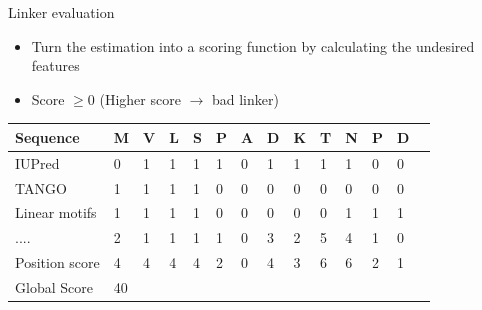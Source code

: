 \documentclass{beamer}
\begin{document}
\begin{frame}{Linker evaluation}
\begin{itemize}

 \item Turn the estimation into a scoring function by calculating the undesired features\\

 \pause
 \item Score $\geqslant 0$ (Higher score $\rightarrow$ bad linker)
\end{itemize}

\pause
\begin{tabular}{llllllllllllll} 
\hline
Sequence & \textbf{M} & \textbf{V} & \textbf{L} & \textbf{S} & \textbf{P} & \textbf{A} & \textbf{D} & \textbf{K} & \textbf{T} & \textbf{N} & \textbf{P} & \textbf{D} \\ \hline \hline
\pause
IUPred                 & 0 & 1 & 1 & 1 & 1 & 0 & 1 & 1 & 1 & 1 & 0 & 0\\ \hline \pause
TANGO 		       & 1 & 1 & 1 & 1 & 0 & 0 & 0 & 0 & 0 & 0 & 0 & 0\\ \hline \pause
Linear motifs          & 1 & 1 & 1 & 1 & 0 & 0 & 0 & 0 & 0 & 1 & 1 & 1\\ \hline \pause
....                   & 2 & 1 & 1 & 1 & 1 & 0 & 3 & 2 & 5 & 4 & 1 & 0\\ \hline \hline
\pause
Position score         & 4 & 4 & 4 & 4 & 2 & 0 & 4 & 3 & 6 & 6 & 2 & 1\\ \hline
\pause
Global Score  & 40 \\ \hline
\end{tabular}
\end{frame}
\end{document}
